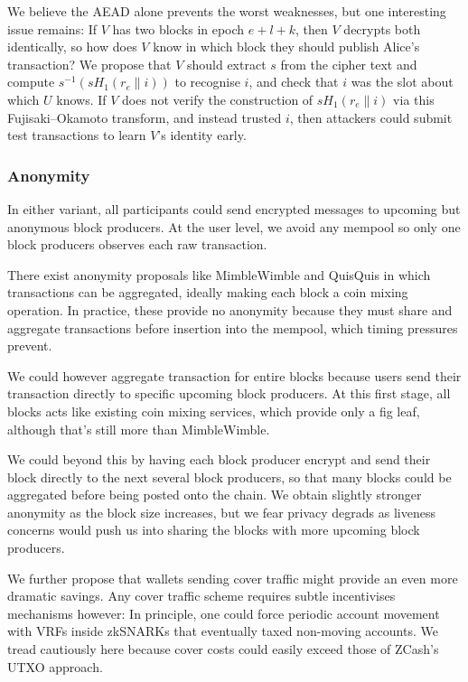 We believe the AEAD alone prevents the worst weaknesses, but one interesting issue remains:  If $V$ has two blocks in epoch $e+l+k$, then $V$ decrypts both identically, so how does $V$ know in which block they should publish Alice's transaction?  We propose that $V$ should extract $s$ from the cipher text and compute $s^{-1} (s H_1(r_e \| i))$ to recognise $i$, and check that $i$ was the slot about which $U$ knows.  If $V$ does not verify the construction of $s H_1(r_e \| i)$ via this Fujisaki–Okamoto transform, and instead trusted $i$, then attackers could submit test transactions to learn $V$'s identity early. 


\subsubsection{Anonymity}

In either variant, all participants could send encrypted messages to upcoming but anonymous block producers.  At the user level, we avoid any mempool so only one block producers observes each raw transaction.  

There exist anonymity proposals like MimbleWimble \cite{MimbleWimble} and QuisQuis \cite{QuisQuis} in which transactions can be aggregated, ideally making each block a coin mixing operation.  In practice, these provide no anonymity because they must share and aggregate transactions before insertion into the mempool, which timing pressures prevent.  

We could however aggregate transaction for entire blocks because users send their transaction directly to specific upcoming block producers.  At this first stage, all blocks acts like existing coin mixing services, which provide only a fig leaf, although that's still more than MimbleWimble.  

We could beyond this by having each block producer encrypt and send their block directly to the next several block producers, so that many blocks could be aggregated before being posted onto the chain.  We obtain slightly stronger anonymity as the block size increases, but we fear privacy degrads as liveness concerns would push us into sharing the blocks with more upcoming block producers. 

We further propose that wallets sending cover traffic might provide an even more dramatic savings.  Any cover traffic scheme requires subtle incentivises mechanisms however:  In principle, one could force periodic account movement with VRFs inside zkSNARKs that eventually taxed non-moving accounts.  We tread cautiously here because cover costs could easily exceed those of ZCash's UTXO approach.


